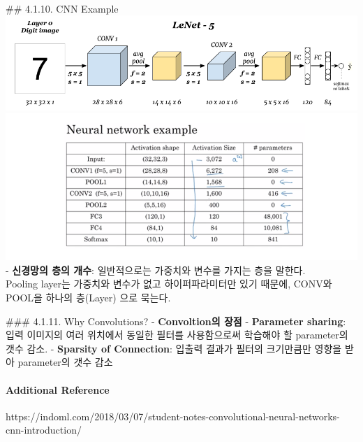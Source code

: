 \documentclass[11pt]{article}
\makeatletter
\def\maxwidth{\ifdim\Gin@nat@width>\linewidth\linewidth
    \else\Gin@nat@width\fi}
\let\Oldincludegraphics\includegraphics
\renewcommand{\includegraphics}[1]{\Oldincludegraphics[width=.8\maxwidth]{#1}}
\makeatother
\begin{document}
    \\
\#\# 4.1.10. CNN Example \includegraphics{./Images/c4week1/18.png}\\
 \includegraphics{./Images/c4week1/18-3.png}\\
 - \textbf{신경망의 층의 개수}: 일반적으로는 가중치와 변수를 가지는 층을
말한다.\\
Pooling layer는 가중치와 변수가 없고 하이퍼파라미터만 있기 때문에,
CONV와 POOL을 하나의 층(Layer) 으로 묵는다.

     \#\#\# 4.1.11. Why Convolutions? - \textbf{Convoltion의 장점} -
\textbf{Parameter sharing}: 입력 이미지의 여러 위치에서 동일한 필터를
사용함으로써 학습해야 할 parameter의 갯수 감소. - \textbf{Sparsity of
Connection}: 입출력 결과가 필터의 크기만큼만 영향을 받아 parameter의
갯수 감소

    \paragraph{Additional Reference}\label{additional-reference}

https://indoml.com/2018/03/07/student-notes-convolutional-neural-networks-cnn-introduction/


    
    
    
    
\end{document}
